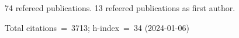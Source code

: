 74 refereed publications. 13 refeered publications as first author.

Total citations~=~3713; h-index~=~34 (2024-01-06)